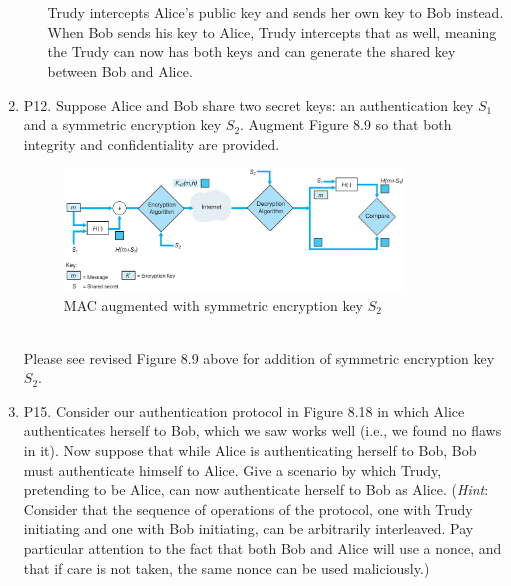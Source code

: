 \documentclass[12pt]{article}
\begin{document}
\begin{enumerate}
\begin{enumerate}
\begin{center}
                \\\
            \end{center}Trudy intercepts Alice's public key and sends her own key to Bob instead. When Bob sends his key to Alice, Trudy intercepts that as well, meaning the Trudy can now has both keys and can generate the shared key between Bob and Alice.\color{black}
		\end{enumerate}
	\item P12. Suppose Alice and Bob share two secret keys: an authentication key \(S_1\) and a symmetric encryption key \(S_2\). Augment Figure 8.9 so that both integrity and confidentiality are provided.
	\setcounter{figure}{8}
	\begin{figure}[h!]
	\centering
	\includegraphics[width=0.85\textwidth]{./Images/Fig08-009.png}
	\caption{MAC augmented with symmetric encryption key \(S_2\)}
	\end{figure}\\
	\color{CrispBlue}Please see revised Figure 8.9 above for addition of symmetric encryption key \(S_2\).\color{black}
	\item P15. Consider our authentication protocol in Figure 8.18 in which Alice authenticates herself to Bob, which we saw works well (i.e., we found no flaws in it). Now suppose that while Alice is authenticating herself to Bob, Bob must authenticate himself to Alice. Give a scenario by which Trudy, pretending to be Alice, can now authenticate herself to Bob as Alice. (\textit{Hint}: Consider that the sequence of operations of the protocol, one with Trudy initiating and one with Bob initiating, can be arbitrarily interleaved. Pay particular attention to the fact that both Bob and Alice will use a nonce, and that if care is not taken, the same nonce can be used maliciously.)\par

\end{enumerate}
\end{document}
